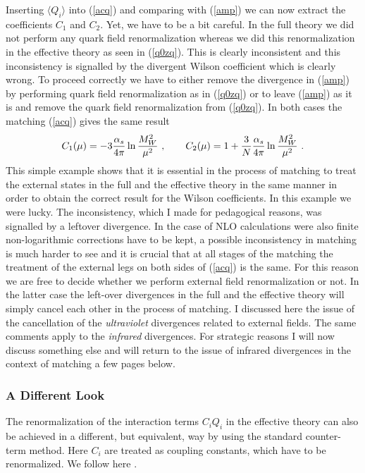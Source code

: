 \documentclass[12pt,rotate]{article}
\def\as{\alpha_s}
\newcommand{\eqn}{\ref}
\def\aspi{\frac{\as}{4\pi}}
\begin{document}
\begin{itemize}
\begin{itemize}
\begin{itemize}
Inserting $\langle Q_i\rangle$ into (\eqn{acq}) and comparing 
with (\eqn{amp})
we can now extract the coefficients $C_1$ and $C_2$. Yet, we have to be
a bit careful. In the full theory we did not perform any quark field 
renormalization whereas we did this renormalization in the effective
theory as seen in (\ref{q0zq}). This is clearly inconsistent and this
inconsistency is signalled by the divergent Wilson coefficient which is 
clearly wrong. To proceed correctly we have to either remove the
divergence in (\eqn{amp}) by performing quark field renormalization 
as in (\ref{q0zq}) or to leave (\eqn{amp}) as it is and remove
the quark field renormalization from (\ref{q0zq}). In both cases
the matching (\eqn{acq}) gives the same result
\begin{equation}\label{cc12}
C_1(\mu)=-3\aspi\ln{M^2_W\over\mu^2}~,   \qquad
C_2(\mu)=1+{3\over N}\aspi\ln{M^2_W\over\mu^2}~.   
\end{equation}
This simple example shows that it is essential in the process of
matching to treat the external
states in the full and the effective theory in the same manner in order
to obtain the correct result for the Wilson coefficients. In this example 
we were lucky. The inconsistency, which I made for pedagogical reasons,
was signalled by a leftover divergence. In the case of NLO calculations
were also finite non-logarithmic corrections have to be kept, a possible
inconsistency in matching is much harder to see and it is crucial that
at all stages of the matching the treatment of the external legs
on both sides of (\eqn{acq}) is the same. For this reason we are free
to decide whether we perform external field renormalization or not.
In the latter case the left-over divergences in the full and the effective
theory will simply cancel each other in the process of matching.
I discussed here the issue of the cancellation of the {\it ultraviolet} 
divergences
related to  external fields. 
The same comments apply to the {\it infrared}
divergences. For strategic reasons I will now discuss something else
and will return to the issue of infrared divergences in the context of 
matching a few pages below. 

\subsubsection{A Different Look}
The renormalization of
the interaction terms $C_i Q_i$ in the effective theory can also be achieved
in a different, but equivalent, way by using
the standard counter-term method. Here $C_i$ are treated as coupling
constants, which have to be renormalized. We follow here \cite{BBL}.


\end{itemize}
\end{itemize}
\end{itemize}
\end{document}
